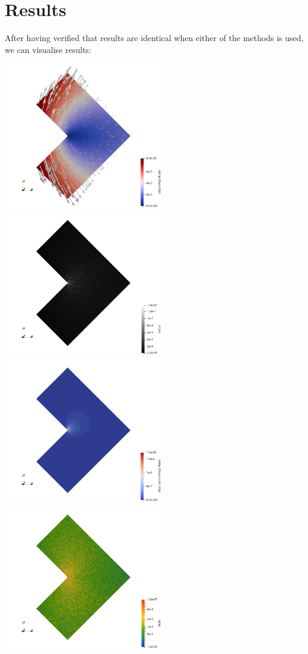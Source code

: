 \section*{Results}

After having verified that results are identical when either 
of the methods is used, we can visualise results:

\begin{center}
\includegraphics[width=7cm]{python_codes/fieldstone_179/RESULTS/disp}
\includegraphics[width=7cm]{python_codes/fieldstone_179/RESULTS/divv}\\
\includegraphics[width=7cm]{python_codes/fieldstone_179/RESULTS/error}
\includegraphics[width=7cm]{python_codes/fieldstone_179/RESULTS/strain}
\end{center}
